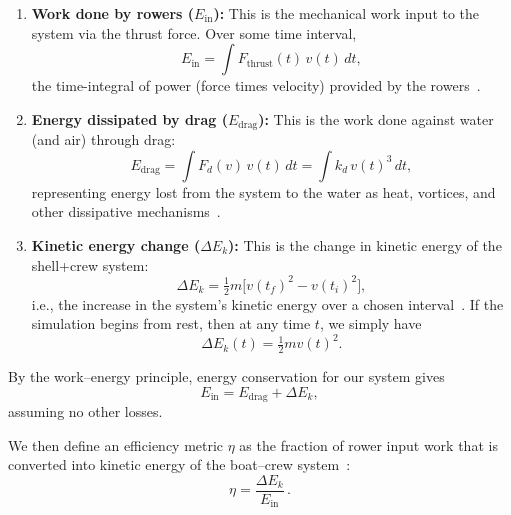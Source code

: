 \documentclass[12pt]{article}
\begin{document}
\begin{enumerate}
    \item \textbf{Work done by rowers ($E_{\text{in}}$):}  
    This is the mechanical work input to the system via the thrust force. Over some time interval,
    \begin{equation}
        E_{\text{in}} = \int F_{\text{thrust}}(t)\, v(t)\, dt ,
        \label{eq:Ein}
    \end{equation}
    the time-integral of power (force times velocity) provided by the rowers~\cite{dudhia2000}.
    
    \item \textbf{Energy dissipated by drag ($E_{\text{drag}}$):}  
    This is the work done against water (and air) through drag:
    \begin{equation}
        E_{\text{drag}} = \int F_d(v)\, v(t)\, dt 
        = \int k_d\, v(t)^3 \, dt ,
        \label{eq:Edrag}
    \end{equation}
    representing energy lost from the system to the water as heat, vortices, and other dissipative mechanisms~\cite{baudouinhawkins2002}.
    
    \item \textbf{Kinetic energy change ($\Delta E_k$):}  
    This is the change in kinetic energy of the shell+crew system:
    \begin{equation}
        \Delta E_k = \tfrac{1}{2}m \big[v(t_f)^2 - v(t_i)^2\big],
        \label{eq:DEk}
    \end{equation}
    i.e., the increase in the system’s kinetic energy over a chosen interval~\cite{pulman2007}.  
    If the simulation begins from rest, then at any time $t$, we simply have 
    \[
    \Delta E_k(t) = \tfrac{1}{2} m v(t)^2 .
    \]
\end{enumerate}

By the work–energy principle, energy conservation for our system gives
\begin{equation}
    E_{\text{in}} = E_{\text{drag}} + \Delta E_k ,
    \label{eq:energy_balance}
\end{equation}
assuming no other losses.

We then define an efficiency metric \texorpdfstring{$\eta$}{eta} as the fraction of rower input work that is converted into kinetic energy of the boat–crew system~\cite{hofmijster2010}:
\begin{equation}
    \eta = \frac{\Delta E_k}{E_{\text{in}}}\, .
    \tag{4}
    \label{eq:efficiency}
\end{equation}
\end{document}
